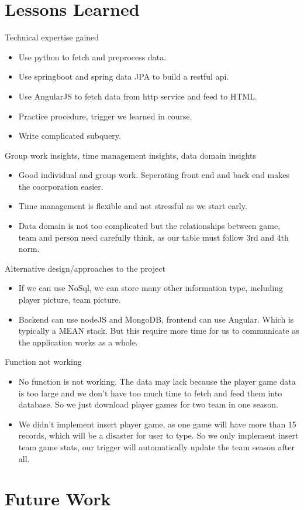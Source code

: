 \documentclass[a4paper,12pt]{article} %
\begin{document}
\section{Lessons Learned}
Technical expertise gained
\begin{itemize}
    \item Use python to fetch and preprocess data.
    \item Use springboot and spring data JPA to build a restful api.
    \item Use AngularJS to fetch data from http service and feed to HTML.
    \item Practice procedure, trigger we learned in course.
    \item Write complicated subquery.
\end{itemize}
Group work insights, time management insights, data domain insights
\begin{itemize}
    \item Good individual and group work. Seperating front end and back end makes the coorporation easier.
    \item Time management is flexible and not stressful as we start early.
    \item Data domain is not too complicated but the relationships between game, team and person need carefully think,
    as our table must follow 3rd and 4th norm.
\end{itemize}
Alternative design/approaches to the project
\begin{itemize}
    \item If we can use NoSql, we can store many other information type, including player picture, team picture. 
    \item Backend can use nodeJS and MongoDB, frontend can use Angular. Which is typically a MEAN stack. But this
    require more time for us to communicate as the application works as a whole.
\end{itemize}
Function not working
\begin{itemize}
    \item No function is not working. The data may lack because the player game data is too large and we don't have too much time
    to fetch and feed them into database. So we just download player games for two team in one season.
    \item We didn't implement insert player game, as one game will have more than 15 records, which will be a disaster for user 
    to type. So we only implement insert team game stats, our trigger will automatically update the team season after all.
\end{itemize}
\section{Future Work}
\end{document}
